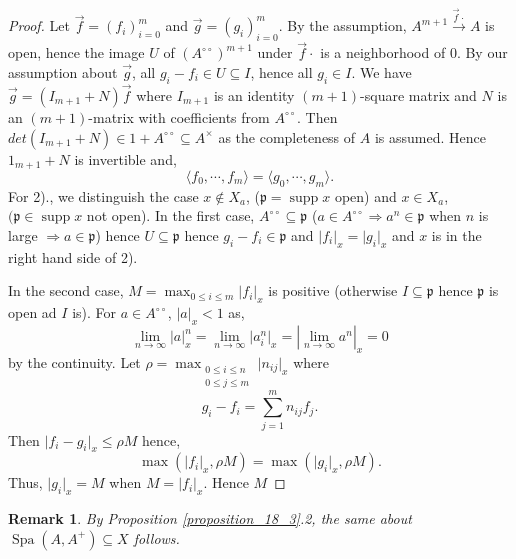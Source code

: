 \documentclass[8pt]{article}
\numberwithin{equation}{section}
\newtheorem{remark}{Remark}[subsection]
\DeclareMathOperator{\supp}{supp}
\DeclareMathOperator{\Spa}{Spa}
\newcommand{\p}[0]{\mathfrak{p}}
\newcommand{\ab}[1]{\vert #1 \vert}
\newcommand{\dcirc}[0]{{\circ\circ}}
\begin{document}
\begin{proof}
    Let $\vec{f}=(f_i)_{i=0}^m$ and $\vec{g}=(g_i)_{i=0}^m$. By the assumption, $A^{m+1}\stackrel{\vec{f}\cdot}{\to}A$ is open, hence the image $U$ of $(A^\dcirc)^{m+1}$ under $\vec{f}\cdot$ is a neighborhood of $0$. By our assumption about $\vec{g}$, all $g_i-f_i\in U\subseteq I$, hence all $g_i\in I$. We have $\vec{g} = (I_{m+1}+N)\vec{f}$ where 
    $I_{m+1}$ is an identity $(m+1)$-square matrix and $N$ is an $(m+1)$-matrix with coefficients from $A^\dcirc$. Then $det(I_{m+1}+N)\in 1+A^\dcirc\subseteq A^\times$ as the completeness of $A$ is assumed. Hence $1_{m+1}+N$ is invertible and,
    \begin{equation*}
        \langle f_0,\cdots,f_m\rangle = \langle g_0,\cdots,g_m\rangle.
    \end{equation*}
    For 2)., we distinguish the case $x\not\in X_a$, ($\p=\supp x$ open) and $x\in X_a$, $(\p\in\supp x$ not open).
    In the first case, $A^\dcirc\subseteq\p$ ($a\in A^\dcirc\Rightarrow a^n\in\p$ when $n$ is large $\Rightarrow a\in\p$) hence $U\subseteq \p$ hence $g_i-f_i\in\p$ and $\ab{f_i}_x=\ab{g_i}_x$ and $x$ is in the right hand side of 2). 
    \par In the second case, $M= \max_{0\leq i\leq m}\ab{f_i}_x$ is positive (otherwise $I\subseteq \p$ hence $\p$ is open ad $I$ is). For $a\in A^\dcirc$, $\ab{a}_x<1$ as,
    \begin{equation*}
        \lim_{n\to\infty}\ab{a}_x^n=\lim_{n\to\infty}\ab{a_i^n}_x = \left\vert \lim_{n\to\infty}a^n\right\vert_x = 0
    \end{equation*}
    by the continuity. Let $\rho = \max_{\substack{0\leq i\leq n\\0\leq j\leq m}}\ab{n_{ij}}_x$ where 
    \begin{equation*}
        g_i - f_i = \sum_{j=1}^mn_{ij}f_j.
    \end{equation*}
    Then $\ab{f_i-g_i}_x\leq\rho M$ hence,
    \begin{equation*}
        \max(\ab{f_i}_{x},\rho M) = \max(\ab{g_i}_x,\rho M).
    \end{equation*}
    Thus, $\ab{g_i}_x=M$ when $M=\ab{f_i}_x$. Hence $M$
\end{proof}

\begin{remark}
    By Proposition \ref{proposition_18_3}.2, the same about $\Spa(A,A^+)\subseteq X$ follows. 
\end{remark}
\end{document}
